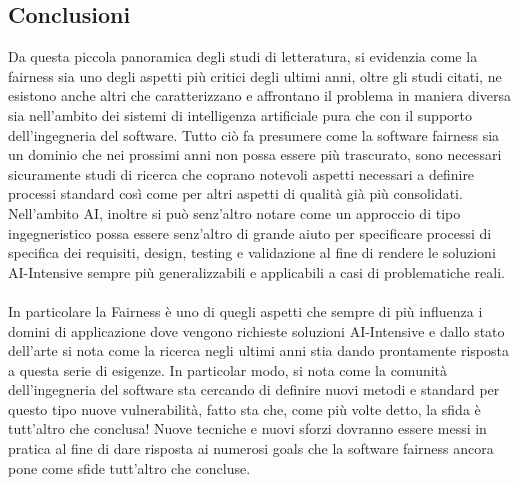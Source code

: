 \subsection{Conclusioni}
Da questa piccola panoramica degli studi di letteratura, si evidenzia come la fairness sia uno degli aspetti più critici degli ultimi anni, oltre gli studi citati, ne esistono anche altri che caratterizzano e affrontano il problema in maniera diversa sia nell'ambito dei sistemi di intelligenza artificiale pura che con il supporto dell'ingegneria del software. Tutto ciò fa presumere come la software fairness sia un dominio che nei prossimi anni non possa essere più trascurato, sono necessari sicuramente studi di ricerca che coprano notevoli aspetti necessari a definire processi standard così come per altri aspetti di qualità già più consolidati. Nell'ambito AI, inoltre si può senz'altro notare come un approccio di tipo ingegneristico possa essere senz'altro di grande aiuto per specificare processi di specifica dei requisiti, design, testing e validazione al fine di rendere le soluzioni AI-Intensive sempre più generalizzabili e applicabili a casi di problematiche reali.\\ \\

In particolare la Fairness è uno di quegli aspetti che sempre di più influenza i domini di applicazione dove vengono richieste soluzioni AI-Intensive e dallo stato dell'arte si nota come la ricerca negli ultimi anni stia dando prontamente risposta a questa serie di esigenze. In particolar modo, si nota come la comunità dell'ingegneria del software sta cercando di definire nuovi metodi e standard per questo tipo nuove  vulnerabilità, fatto sta che, come più volte detto, la sfida è tutt'altro che conclusa! Nuove tecniche e nuovi sforzi dovranno essere messi in pratica al fine di dare risposta ai numerosi goals che la software fairness ancora pone come sfide tutt'altro che concluse.
\newpage


